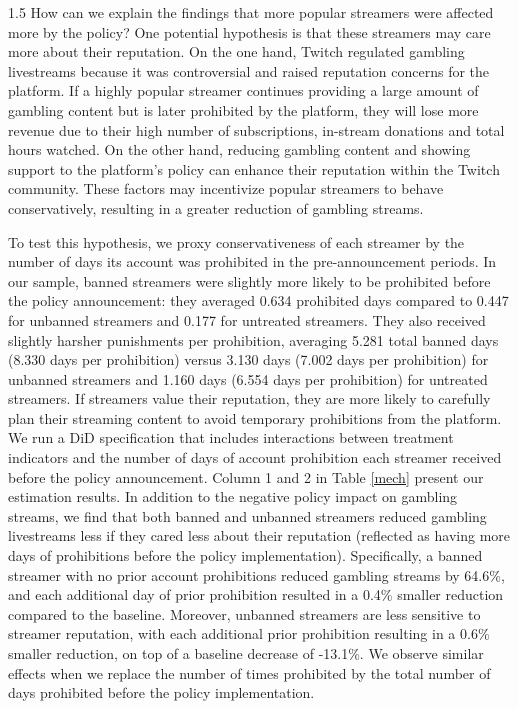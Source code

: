 \documentclass[a4paper,12pt]{article}
\begin{document}
\begin{spacing}{1.5}
How can we explain the findings that more popular streamers were affected more by the policy? One potential hypothesis is that these streamers may care more about their reputation. On the one hand, Twitch regulated gambling livestreams because it was controversial and raised reputation concerns for the platform. If a highly popular streamer continues providing a large amount of gambling content but is later prohibited by the platform, they will lose more revenue due to their high number of subscriptions, in-stream donations and total hours watched. On the other hand, reducing gambling content and showing support to the platform's policy can enhance their reputation within the Twitch community. These factors may incentivize popular streamers to behave conservatively, resulting in a greater reduction of gambling streams.

To test this hypothesis, we proxy conservativeness of each streamer by the number of days its account was prohibited in the pre-announcement periods. In our sample, banned streamers were slightly more likely to be prohibited before the policy announcement: they averaged 0.634 prohibited days compared to 0.447 for unbanned streamers and 0.177 for untreated streamers. They also received slightly harsher punishments per prohibition, averaging 5.281 total banned days (8.330 days per prohibition) versus 3.130 days (7.002 days per prohibition) for unbanned streamers and 1.160 days (6.554 days per prohibition) for untreated streamers. If streamers value their reputation, they are more likely to carefully plan their streaming content to avoid temporary prohibitions from the platform. We run a DiD specification that includes interactions between treatment indicators and the number of days of account prohibition each streamer received before the policy announcement. Column 1 and 2 in Table \ref{mech} present our estimation results. In addition to the negative policy impact on gambling streams, we find that both banned and unbanned streamers reduced gambling livestreams less if they cared less about their reputation (reflected as having more days of prohibitions before the policy implementation). Specifically, a banned streamer with no prior account prohibitions reduced gambling streams by 64.6\%, and each additional day of prior prohibition resulted in a 0.4\% smaller reduction compared to the baseline. Moreover, unbanned streamers are less sensitive to streamer reputation, with each additional prior prohibition resulting in a 0.6\% smaller reduction, on top of a baseline decrease of -13.1\%. We observe similar effects when we replace the number of times prohibited by the total number of days prohibited before the policy implementation.


\end{spacing}
\end{document}
